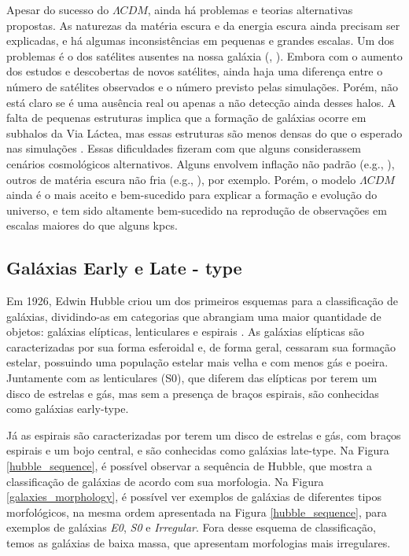 Apesar do sucesso do $\Lambda CDM$, ainda há problemas e teorias alternativas propostas. As naturezas da matéria escura e da energia escura ainda precisam ser explicadas, e há algumas inconsistências em pequenas e grandes escalas. Um dos problemas é o dos satélites ausentes na nossa galáxia (\citealp{Klypin_1999}, \citealp{Moore_1999}). Embora com o aumento dos estudos e descobertas de novos satélites, ainda haja uma diferença entre o número de satélites observados e o número previsto pelas simulações. Porém, não está claro se é uma ausência real ou apenas a não detecção ainda desses halos. A falta de pequenas estruturas implica que a formação de galáxias ocorre em subhalos da Via Láctea, mas essas estruturas são menos densas do que o esperado nas simulações \citep{Boylan_Kolchin_2011}. Essas dificuldades fizeram com que alguns considerassem cenários cosmológicos alternativos. Alguns envolvem inflação não padrão (e.g., \citealp{Kamionkowski_2000}), outros de matéria escura não fria (e.g., \citealp{Murgia_2017}), por exemplo. Porém, o modelo $\Lambda CDM$ ainda é o mais aceito e bem-sucedido para explicar a formação e evolução do universo, e tem sido altamente bem-sucedido na reprodução de observações em escalas maiores do que alguns kpcs.


\subsection{Galáxias Early e Late - type}\label{subsec:Galaxia_early_late}
Em 1926, Edwin Hubble criou um dos primeiros esquemas para a classificação de galáxias, dividindo-as em categorias que abrangiam uma maior quantidade de objetos: galáxias elípticas, lenticulares e espirais \citep{hubble_classification_1926}. As galáxias elípticas são caracterizadas por sua forma esferoidal e, de forma geral, cessaram sua formação estelar, possuindo uma população estelar mais velha e com menos gás e poeira. Juntamente com as lenticulares (S0), que diferem das elípticas por terem um disco de estrelas e gás, mas sem a presença de braços espirais, são conhecidas como galáxias early-type.

Já as espirais são caracterizadas por terem um disco de estrelas e gás, com braços espirais e um bojo central, e são conhecidas como galáxias late-type. Na Figura \ref{hubble_sequence}, é possível observar a sequência de Hubble, que mostra a classificação de galáxias de acordo com sua morfologia. Na Figura \ref{galaxies_morphology}, é possível ver exemplos de galáxias de diferentes tipos morfológicos, na mesma ordem apresentada na Figura \ref{hubble_sequence}, para exemplos de galáxias \textit{E0}, \textit{S0} e \textit{Irregular}. Fora desse esquema de classificação, temos as galáxias de baixa massa, que apresentam morfologias mais irregulares.

